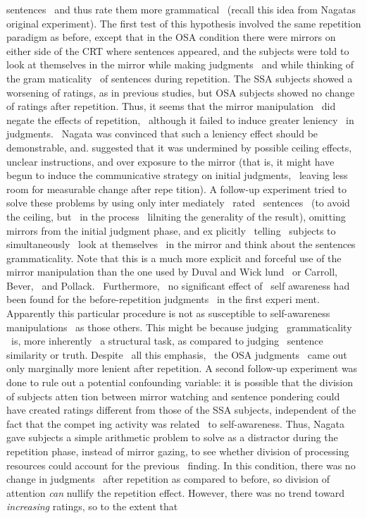 \begin{styleStandard}
sentences \ and thus rate them more grammatical \ (recall this idea from Nagata{\textquotesingle}s original experiment). The first test of this hypothesis involved the same repetition paradigm as before, except that in the OSA condition there were mirrors on either side of the CRT where sentences appeared, and the subjects were told to look at themselves in the mirror while making judgments \ and while thinking of the gram\- maticality \ of sentences during repetition. The SSA subjects showed a worsening of ratings, as in previous studies, but OSA subjects showed no change of ratings after repetition. Thus, it seems that the mirror manipulation \ did negate the effects of repetition, \ although it failed to induce greater leniency \ in judgments. \ Nagata was convinced that such a leniency effect should be demonstrable, and. suggested that it was undermined by possible ceiling effects, unclear instructions, and over\- exposure to the mirror (that is, it might have begun to induce the communicative strategy on initial judgments, \ leaving less room for measurable change after repe\- tition). A follow-up experiment tried to solve these problems by using only inter\- mediately \ rated \ sentences \ (to avoid the ceiling, but \ in the process \ lilniting the generality of the result), omitting mirrors from the initial judgment phase, and ex\- plicitly \ telling \ subjects to simultaneously \ look at themselves \ in the mirror and think about the sentences{\textquotesingle} grammaticality. Note that this is a much more explicit and forceful use of the mirror manipulation than the one used by Duval and Wick\- lund \ or Carroll, Bever, \ and Pollack. \ Furthermore, \ no significant effect of \ self\- awareness had been found for the before-repetition judgments \ in the first experi\- ment. Apparently this particular procedure is not as susceptible to self-awareness manipulations \ as those others. This might be because judging \ grammaticality \ is, more inherently \ a structural task, as compared to judging \ sentence similarity or truth. Despite \ all this emphasis, \ the OSA judgments \ came out only marginally more lenient after repetition. A second follow-up experiment was done to rule out a potential confounding variable: it is possible that the division of subjects{\textquotesingle} atten\- tion between mirror watching and sentence pondering could have created ratings different from those of the SSA subjects, independent of the fact that the compet\- ing activity was related \ to self-awareness. Thus, Nagata gave subjects a simple arithmetic problem to solve as a distractor during the repetition phase, instead of mirror gazing, to see whether division of processing resources could account for the previous \ finding. In this condition, there was no change in judgments \ after repetition as compared to before, so division of attention \textit{can}\textit{ }nullify the repetition effect. However, there was no trend toward \textit{increasing}\textit{ }ratings, so to the extent that
\end{styleStandard}


